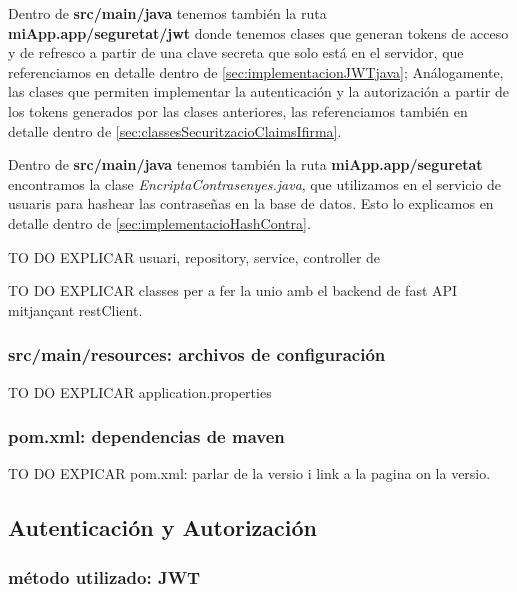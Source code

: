 \documentclass[a4paper,12pt]{report}
\begin{document}
				
				
				Dentro de \textbf{src/main/java} tenemos también la ruta \textbf{miApp.app/seguretat/jwt} donde tenemos clases que generan tokens de acceso y de refresco  a partir de una clave secreta que solo está en el servidor, que referenciamos en detalle dentro de \ref{sec:implementacionJWTjava}; Análogamente, las clases que permiten implementar la autenticación y la autorización a partir de los tokens generados por las clases anteriores, las referenciamos también en detalle dentro de \ref{sec:classesSecuritzacioClaimsIfirma}.
				
				Dentro de \textbf{src/main/java} tenemos también la ruta \textbf{miApp.app/seguretat} encontramos la clase \textit{EncriptaContrasenyes.java}, que utilizamos en el servicio de usuaris para hashear las contraseñas en la base de datos. Esto lo explicamos en detalle dentro de \ref{sec:implementacioHashContra}.
				
				
				TO DO EXPLICAR 	\hspace{3em} usuari, repository, service, controller de 
			
				TO DO EXPLICAR 	\hspace{3em} classes per a fer la unio amb el backend de fast API mitjançant restClient.
				
				
				
				\subsubsection{src/main/resources: archivos de configuración}
				
				TO DO EXPLICAR application.properties
				
				\subsubsection{pom.xml: dependencias de maven}
				
				
				 
				
				TO DO EXPICAR pom.xml: parlar de la versio i link a la pagina on la versio.
				
				
			
				
				\subsection{Autenticación y Autorización}
				
				\subsubsection{método utilizado: JWT}
				
\end{document}
